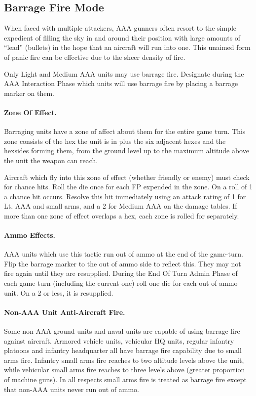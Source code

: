 \subsection{Barrage Fire Mode}

When faced with multiple attackers, AAA gunners often resort to the simple expedient of filling the sky in and around their position with large amounts of “lead” (bullets) in the hope that an aircraft will run into one. This unaimed form of panic fire can be effective due to the sheer density of fire.

Only Light and Medium AAA units may use barrage fire. Designate during the AAA Interaction Phase which units will use barrage fire by placing a barrage marker on them.

\paragraph{Zone Of Effect.} Barraging units have a zone of affect about them for the entire game turn. This zone consists of the hex the unit is in plus the six adjacent hexes and the hexsides forming them, from the ground level up to the maximum altitude above the unit the weapon can reach.

Aircraft which fly into this zone of effect (whether friendly or enemy) must check for chance hits. Roll the die once for each FP expended in the zone. On a roll of 1 a chance hit occurs. Resolve this hit immediately using an attack rating of 1 for Lt. AAA and small arms, and a 2 for Medium AAA on the damage tables. If more than one zone of effect overlaps a hex, each zone is rolled for separately.

\paragraph{Ammo Effects.} AAA units which use this tactic run out of ammo at the end of the game-turn. Flip the barrage marker to the out of ammo side to reflect this. They may not fire again until they are resupplied. During the End Of Turn Admin Phase of each game-turn (including the current one) roll one die for each out of ammo unit. On a 2 or less, it is resupplied.

\paragraph{Non-AAA Unit Anti-Aircraft Fire.} Some non-AAA ground units and naval units are capable of using barrage fire against aircraft. Armored vehicle units, vehicular HQ units, regular infantry platoons and infantry headquarter all have barrage fire capability due to small arms fire. Infantry small arms fire reaches to two altitude levels above the unit, while vehicular small arms fire reaches to three levels above (greater proportion of machine guns). In all respects small arms fire is treated as barrage fire except that non-AAA units never run out of ammo.

